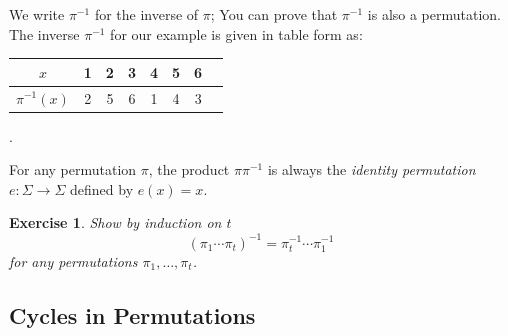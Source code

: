 \documentclass[11pt]{article}
\newtheorem{exercise}{Exercise}
\begin{document}
We write $\pi^{-1}$ for the inverse of $\pi$; You can prove that
$\pi^{-1}$ is also a permutation. The inverse $\pi^{-1}$ for our example
is given in table form as:
\begin{center}
    \begin{minipage}{2in}
        \begin{tabular}{c|*{7}c}
            $x$            & 1 & 2 & 3 & 4 & 5 & 6 \\ \hline
            $\pi^{-1}(x)$  & 2 & 5 & 6 & 1 & 4 & 3
        \end{tabular}.
    \end{minipage}
\end{center}
For any permutation $\pi$, the product $\pi\pi^{-1}$ is always the
\emph{identity permutation} $e:\Sigma\to\Sigma$ defined by $e(x)=x$.
\begin{exercise}
    Show by induction on $t$ 
    \[
        (\pi_1\cdots\pi_t)^{-1}
        =  \pi_t^{-1}\cdots\pi_1^{-1}
    \]
    for any permutations $\pi_1,\ldots,\pi_t$.
\end{exercise}

\subsection{Cycles in Permutations}
\end{document}
